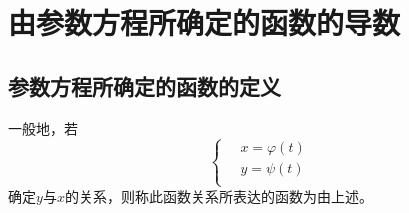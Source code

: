 \section{由参数方程所确定的函数的导数}
\subsection{参数方程所确定的函数的定义}
一般地，若
\begin{equation}
	\left\{ \begin{aligned}
		&\, x=\varphi(t)\\
		&\, y=\psi (t)\\
	\end{aligned}\right.
\end{equation}
确定$y$与$x$的关系，则称此函数关系所表达的函数为由上述。
